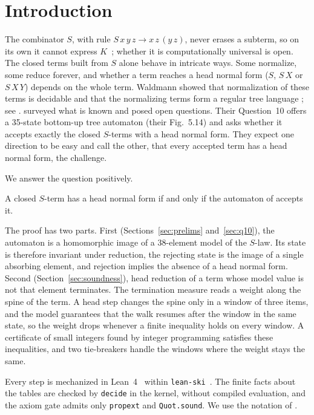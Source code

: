 \section{Introduction}\label{sec:intro}

The combinator $S$, with rule $S\,x\,y\,z\to x\,z\,(y\,z)$, never erases a subterm, so on
its own it cannot express $K$~\citep{waldmann-thesis}; whether it is computationally
universal is open. The closed terms built from $S$ alone behave in intricate ways. Some normalize, some
reduce forever, and whether a term reaches a head normal form ($S$, $S\,X$ or $S\,X\,Y$)
depends on the whole term. Waldmann showed that normalization of these terms is
decidable and that the normalizing terms form a regular tree language
\citep{waldmann-thesis,waldmann-ic}; see \citet[Theorem~9]{dots}.
\citet{dots} surveyed what is known and posed open questions. Their Question~10 offers a
35-state bottom-up tree automaton (their Fig.~5.14) and asks whether it accepts exactly
the closed $S$-terms with a head normal form. They expect one direction to be easy and
call the other, that every accepted term has a head normal form, the challenge.

We answer the question positively.

\begin{theorem}\label{thm:main}
A closed $S$-term has a head normal form if and only if the automaton of
\textup{\citet[Fig.~5.14]{dots}} accepts it.
\end{theorem}

The proof has two parts. First (Sections~\ref{sec:prelims} and~\ref{sec:q10}), the
automaton is a homomorphic image of a 38-element model of the $S$-law. Its state is
therefore invariant under reduction, the rejecting state is the image of a single
absorbing element, and rejection implies the absence of a head normal form. Second
(Section~\ref{sec:soundness}), head reduction of a term whose model value is not that
element terminates. The termination measure reads a weight along the spine of the term.
A head step changes the spine only in a window of three items, and the model guarantees
that the walk resumes after the window in the same state, so the weight drops whenever a
finite inequality holds on every window. A certificate of small integers found by integer
programming satisfies these inequalities, and two tie-breakers handle the windows where
the weight stays the same.

Every step is mechanized in Lean~4~\citep{lean4} within \texttt{lean-ski}~\citep{leanski}.
The finite facts about the tables are checked by \texttt{decide} in the kernel, without
compiled evaluation, and the axiom gate admits only \texttt{propext} and
\texttt{Quot.sound}. We use the notation of \citet{barendregt}.
